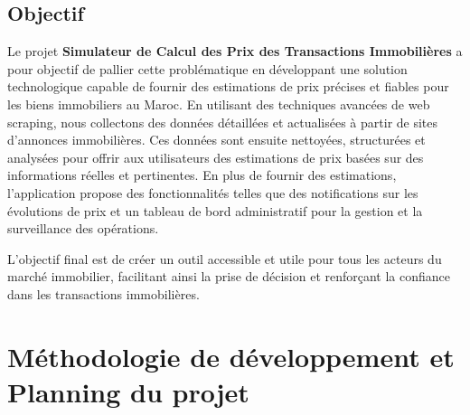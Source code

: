 \documentclass[a4paper,12pt]{report}
\numberwithin{equation}{section}
\begin{document}
\section{Objectif}
\vspace{0.5cm}
{\large
\par Le projet \textbf{Simulateur de Calcul des Prix des Transactions Immobilières} a pour objectif de pallier cette problématique en développant une solution technologique capable de fournir des estimations de prix précises et fiables pour les biens immobiliers au Maroc. En utilisant des techniques avancées de web scraping, nous collectons des données détaillées et actualisées à partir de sites d'annonces immobilières. Ces données sont ensuite nettoyées, structurées et analysées pour offrir aux utilisateurs des estimations de prix basées sur des informations réelles et pertinentes. En plus de fournir des estimations, l'application propose des fonctionnalités telles que des notifications sur les évolutions de prix et un tableau de bord administratif pour la gestion et la surveillance des opérations. 
\par L'objectif final est de créer un outil accessible et utile pour tous les acteurs du marché immobilier, facilitant ainsi la prise de décision et renforçant la confiance dans les transactions immobilières.\par
}

\newpage
\chapter{Méthodologie de développement et Planning du projet}
\end{document}
